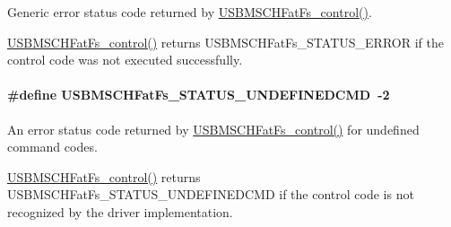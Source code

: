 Generic error status code returned by \hyperlink{_u_s_b_m_s_c_h_fat_fs_8h_a8725aac569cefabe624b5bfda0d07422}{U\+S\+B\+M\+S\+C\+H\+Fat\+Fs\+\_\+control()}. 

\hyperlink{_u_s_b_m_s_c_h_fat_fs_8h_a8725aac569cefabe624b5bfda0d07422}{U\+S\+B\+M\+S\+C\+H\+Fat\+Fs\+\_\+control()} returns U\+S\+B\+M\+S\+C\+H\+Fat\+Fs\+\_\+\+S\+T\+A\+T\+U\+S\+\_\+\+E\+R\+R\+O\+R if the control code was not executed successfully. 
\paragraph[{U\+S\+B\+M\+S\+C\+H\+Fat\+Fs\+\_\+\+S\+T\+A\+T\+U\+S\+\_\+\+U\+N\+D\+E\+F\+I\+N\+E\+D\+C\+M\+D}]{\setlength{\rightskip}{0pt plus 5cm}\#define U\+S\+B\+M\+S\+C\+H\+Fat\+Fs\+\_\+\+S\+T\+A\+T\+U\+S\+\_\+\+U\+N\+D\+E\+F\+I\+N\+E\+D\+C\+M\+D~-\/2}\label{group___u_s_b_m_s_c_h_fat_fs___s_t_a_t_u_s_ga60260295df38b47e3e58ec29003d52b4}


An error status code returned by \hyperlink{_u_s_b_m_s_c_h_fat_fs_8h_a8725aac569cefabe624b5bfda0d07422}{U\+S\+B\+M\+S\+C\+H\+Fat\+Fs\+\_\+control()} for undefined command codes. 

\hyperlink{_u_s_b_m_s_c_h_fat_fs_8h_a8725aac569cefabe624b5bfda0d07422}{U\+S\+B\+M\+S\+C\+H\+Fat\+Fs\+\_\+control()} returns U\+S\+B\+M\+S\+C\+H\+Fat\+Fs\+\_\+\+S\+T\+A\+T\+U\+S\+\_\+\+U\+N\+D\+E\+F\+I\+N\+E\+D\+C\+M\+D if the control code is not recognized by the driver implementation. 